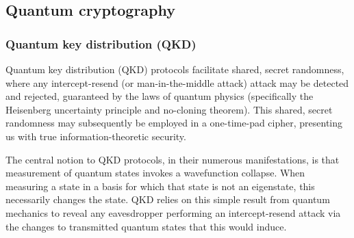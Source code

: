 %
%

\subsection{Quantum cryptography}

%
%

\subsubsection{Quantum key distribution (QKD)} \label{sec:QKD} 



Quantum key distribution (QKD) protocols facilitate shared, secret randomness, where any intercept-resend (or man-in-the-middle attack) attack may be detected and rejected, guaranteed by the laws of quantum physics (specifically the Heisenberg uncertainty principle and no-cloning theorem). This shared, secret randomness may subsequently be employed in a one-time-pad cipher, presenting us with true information-theoretic security.

The central notion to QKD protocols, in their numerous manifestations, is that measurement of quantum states invokes a wavefunction collapse. When measuring a state in a basis for which that state is not an eigenstate, this necessarily changes the state. QKD relies on this simple result from quantum mechanics to reveal any eavesdropper performing an intercept-resend attack via the changes to transmitted quantum states that this would induce.

